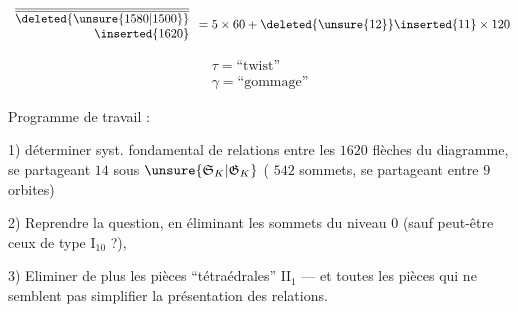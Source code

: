 \[
\begin{array}{r}
\overline{\overline{\deleted{\unsure{1580|1500}}}}\\
\inserted{1620}
\end{array}
=5\times60+\deleted{\unsure{12}}\inserted{11}\times120
\]

\[
\begin{array}{l}
\tau=\text{``twist''}\\
\gamma=\text{``gommage''}
\end{array}
\]

Programme de travail :

1) déterminer  syst. fondamental de
relations entre les \(1620\) flèches
du diagramme, se partageant
 \(14\)  sous \(\unsure{\mathfrak S_K|\mathfrak G_K}\) ( \(542\)
sommets, se partageant entre \(9\) orbites)



2) Reprendre la question, en éliminant
les sommets du niveau \(0\) (sauf
peut-être ceux de type \(\mathrm I_{10}\) ?),

3) Eliminer de plus les pièces
 ``tétraédrales'' \(\mathrm{II}_1\) --- et toutes
les pièces qui ne semblent pas
simplifier la présentation des relations.

